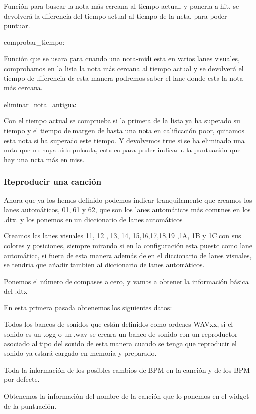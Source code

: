 \documentclass[a4paper,11pt,oneside]{book}
\begin{document}
Función para buscar la nota más cercana al tiempo actual, y ponerla a hit, se devolverá la diferencia del tiempo actual al tiempo de la nota, para poder puntuar.

comprobar\_tiempo:

Función que se usara para cuando una nota-midi esta en varios lanes visuales, comprobamos en la lista la nota más cercana al tiempo actual y se devolverá el tiempo de diferencia de esta manera podremos saber el lane donde esta la nota más cercana.


eliminar\_nota\_antigua:

Con el tiempo actual se comprueba si la primera de la lista ya ha superado su tiempo y el tiempo de margen de hasta una nota en calificación poor, quitamos esta nota si ha superado este tiempo. Y devolvemos true si se ha eliminado una nota que no haya sido pulsada, esto es para poder indicar a la puntuación que hay una nota más en miss.

\subsubsection{Reproducir una canción}
Ahora que ya los hemos definido podemos indicar tranquilamente que creamos los lanes automáticos, 01, 61 y 62, que son los lanes automáticos más comunes en los .dtx. y los ponemos en un diccionario de lanes automáticos.

Creamos los lanes visuales 11, 12 , 13, 14, 15,16,17,18,19 ,1A, 1B y 1C con sus colores y posiciones, siempre mirando si en la configuración esta puesto como lane automático, si fuera de esta manera además de en el diccionario de lanes visuales, se tendría que añadir también al diccionario de lanes automáticos.


Ponemos el número de compases a cero, y vamos a obtener la información básica del .dtx

En esta primera pasada obtenemos los siguientes datos:

Todos los bancos de sonidos que están definidos como ordenes WAVxx, si el sonido es un .ogg o un .wav se creara un banco de sonido con un reproductor asociado al tipo del sonido de esta manera cuando se tenga que reproducir el sonido ya estará cargado en memoria y preparado.

Toda la información de los posibles cambios de BPM en la canción y de los BPM por defecto.

Obtenemos la información del nombre de la canción que lo ponemos en el widget de la puntuación.
\end{document}
